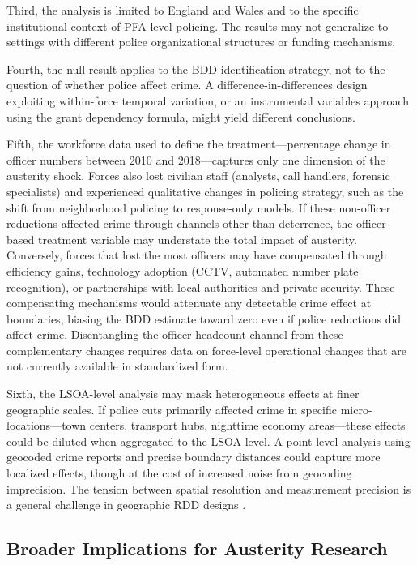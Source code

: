 \documentclass[12pt]{article}
\begin{document}
Third, the analysis is limited to England and Wales and to the specific institutional context of PFA-level policing. The results may not generalize to settings with different police organizational structures or funding mechanisms.

Fourth, the null result applies to the BDD identification strategy, not to the question of whether police affect crime. A difference-in-differences design exploiting within-force temporal variation, or an instrumental variables approach using the grant dependency formula, might yield different conclusions.

Fifth, the workforce data used to define the treatment---percentage change in officer numbers between 2010 and 2018---captures only one dimension of the austerity shock. Forces also lost civilian staff (analysts, call handlers, forensic specialists) and experienced qualitative changes in policing strategy, such as the shift from neighborhood policing to response-only models. If these non-officer reductions affected crime through channels other than deterrence, the officer-based treatment variable may understate the total impact of austerity. Conversely, forces that lost the most officers may have compensated through efficiency gains, technology adoption (CCTV, automated number plate recognition), or partnerships with local authorities and private security. These compensating mechanisms would attenuate any detectable crime effect at boundaries, biasing the BDD estimate toward zero even if police reductions did affect crime. Disentangling the officer headcount channel from these complementary changes requires data on force-level operational changes that are not currently available in standardized form.

Sixth, the LSOA-level analysis may mask heterogeneous effects at finer geographic scales. If police cuts primarily affected crime in specific micro-locations---town centers, transport hubs, nighttime economy areas---these effects could be diluted when aggregated to the LSOA level. A point-level analysis using geocoded crime reports and precise boundary distances could capture more localized effects, though at the cost of increased noise from geocoding imprecision. The tension between spatial resolution and measurement precision is a general challenge in geographic RDD designs \citep{keele2015}.

\subsection{Broader Implications for Austerity Research}
\end{document}
